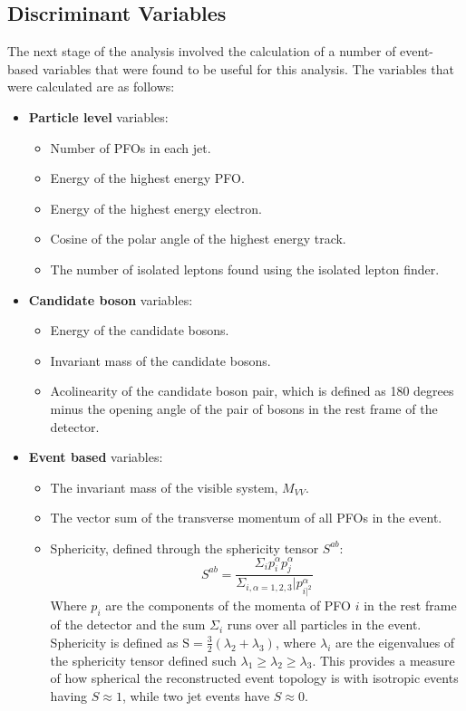 
\subsection{Discriminant Variables} 
\label{sec:analysisprocessor}
The next stage of the analysis involved the calculation of a number of event-based variables that were found to be useful for this analysis.  The variables that were calculated are as follows:

\begin{itemize}
\item \textbf{Particle level} variables:

\begin{itemize}
\item Number of PFOs in each jet.
\item Energy of the highest energy PFO.
\item Energy of the highest energy electron.
\item Cosine of the polar angle of the highest energy track.
\item The number of isolated leptons found using the isolated lepton finder.
\end{itemize}

\item \textbf{Candidate boson} variables:

\begin{itemize}
\item Energy of the candidate bosons.
\item Invariant mass of the candidate bosons.
\item Acolinearity of the candidate boson pair, which is defined as 180 degrees minus the opening angle of the pair of bosons in the rest frame of the detector.
\end{itemize}

\item \textbf{Event based} variables:  

\begin{itemize}
\item The invariant mass of the visible system, $M_{VV}$.
\item The vector sum of the transverse momentum of all PFOs in the event. 
\item Sphericity, defined through the sphericity tensor $S^{ab}$:
\begin{equation}
S^{ab} = \frac{\Sigma_{i}p^{\alpha}_{i}p^{\alpha}_{j}}{\Sigma_{i,\alpha=1,2,3}|p^{\alpha}_{i|^{2}}}
\end{equation}
Where $p_{i}$ are the components of the momenta of PFO $i$ in the rest frame of the detector and the sum $\Sigma_{i}$ runs over all particles in the event.  Sphericity is defined as $\text{S} = \frac{3}{2}(\lambda_{2} + \lambda_{3})$, where $\lambda_{i}$ are the eigenvalues of the sphericity tensor defined such $\lambda_{1} \geq \lambda_{2} \geq \lambda_{3}$.  This provides a measure of how spherical the reconstructed event topology is with isotropic events having $S \approx 1$, while two jet events have $S \approx 0$.
\end{itemize}


\end{itemize}
